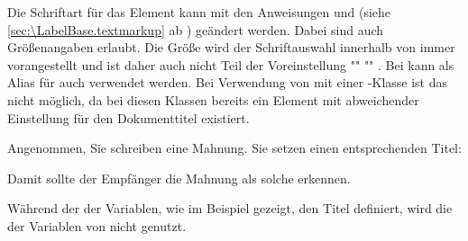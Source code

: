 %
%
Die Schriftart für das Element %
 kann mit den Anweisungen
 und
 (siehe
\autoref{sec:\LabelBase.textmarkup} ab
) geändert werden. Dabei sind auch
Größenangaben erlaubt. Die Größe  wird der Schriftauswahl
innerhalb von \KOMAScript{} immer vorangestellt und ist daher auch nicht
Teil der Voreinstellung
""%
""%
. Bei
 kann als Alias für
 auch
 verwendet werden. Bei
Verwendung von  mit einer \KOMAScript-Klasse ist das
nicht möglich, da bei diesen Klassen bereits ein Element
 mit abweichender Einstellung für den Dokumenttitel
existiert.%
%
%
\begin{Example}
  Angenommen, Sie schreiben eine Mahnung. Sie setzen einen
  entsprechenden Titel:
\begin{lstcode}
\end{lstcode}
  Damit sollte der Empfänger die Mahnung als solche erkennen.
\end{Example}
Während der  der Variablen, wie im Beispiel gezeigt, den Titel
definiert, wird die  der Variablen  von
\KOMAScript{} nicht genutzt.
%
\EndIndexGroup


